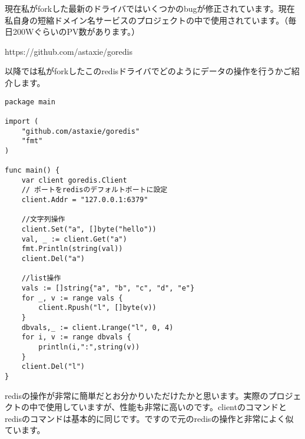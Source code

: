 現在私がforkした最新のドライバではいくつかのbugが修正されています。現在私自身の短縮ドメイン名サービスのプロジェクトの中で使用されています。（毎日200WぐらいのPV数があります。）

https://github.com/astaxie/goredis

以降では私がforkしたこのredisドライバでどのようにデータの操作を行うかご紹介します。

\begin{lstlisting}[numbers=none]
package main

import (
    "github.com/astaxie/goredis"
    "fmt"
)

func main() {
    var client goredis.Client
    // ポートをredisのデフォルトポートに設定
    client.Addr = "127.0.0.1:6379"

    //文字列操作
    client.Set("a", []byte("hello"))
    val, _ := client.Get("a")
    fmt.Println(string(val))
    client.Del("a")

    //list操作
    vals := []string{"a", "b", "c", "d", "e"}
    for _, v := range vals {
        client.Rpush("l", []byte(v))
    }
    dbvals,_ := client.Lrange("l", 0, 4)
    for i, v := range dbvals {
        println(i,":",string(v))
    }
    client.Del("l")
}
\end{lstlisting}

redisの操作が非常に簡単だとお分かりいただけたかと思います。実際のプロジェクトの中で使用していますが、性能も非常に高いのです。clientのコマンドとredisのコマンドは基本的に同じです。ですので元のredisの操作と非常によく似ています。

